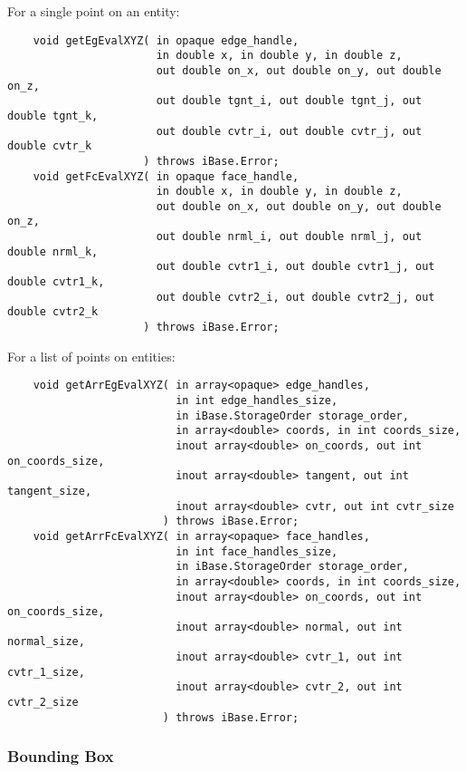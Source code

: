 \documentclass{article}
\begin{document}
\hspace{-16pt}For a single point on an entity:
\begin{verbatim}
    void getEgEvalXYZ( in opaque edge_handle, 
                       in double x, in double y, in double z,
                       out double on_x, out double on_y, out double on_z,
                       out double tgnt_i, out double tgnt_j, out double tgnt_k,
                       out double cvtr_i, out double cvtr_j, out double cvtr_k
                     ) throws iBase.Error;			
    void getFcEvalXYZ( in opaque face_handle, 
                       in double x, in double y, in double z,
                       out double on_x, out double on_y, out double on_z,
                       out double nrml_i, out double nrml_j, out double nrml_k,
                       out double cvtr1_i, out double cvtr1_j, out double cvtr1_k,
                       out double cvtr2_i, out double cvtr2_j, out double cvtr2_k
                     ) throws iBase.Error;			
\end{verbatim}

\hspace{-16pt}For a list of points on entities:
\begin{verbatim}			
    void getArrEgEvalXYZ( in array<opaque> edge_handles,
                          in int edge_handles_size,
                          in iBase.StorageOrder storage_order,
                          in array<double> coords, in int coords_size,
                          inout array<double> on_coords, out int on_coords_size,
                          inout array<double> tangent, out int tangent_size,
                          inout array<double> cvtr, out int cvtr_size
                        ) throws iBase.Error;
    void getArrFcEvalXYZ( in array<opaque> face_handles,
                          in int face_handles_size,
                          in iBase.StorageOrder storage_order,
                          in array<double> coords, in int coords_size,
                          inout array<double> on_coords, out int on_coords_size,
                          inout array<double> normal, out int normal_size,
                          inout array<double> cvtr_1, out int cvtr_1_size,
                          inout array<double> cvtr_2, out int cvtr_2_size
                        ) throws iBase.Error;
\end{verbatim}

\subsubsection{Bounding Box}
\end{document}

